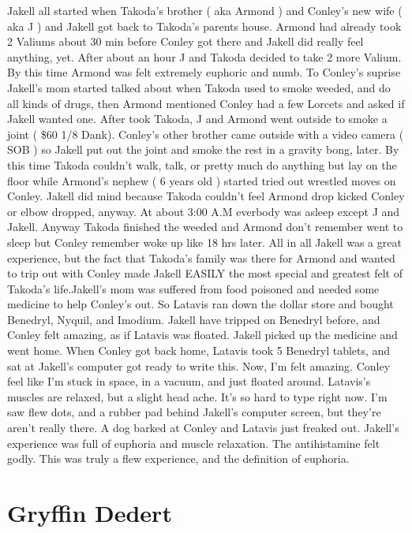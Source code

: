\documentclass[12pt]{book}
\begin{document}
Jakell all started when Takoda's brother ( aka Armond ) and Conley's new wife ( aka J ) and Jakell got back to Takoda's parents house. Armond had already took 2 Valiums about 30 min before Conley got there and Jakell did really feel anything, yet. After about an hour J and Takoda decided to take 2 more Valium. By this time Armond was felt extremely euphoric and numb. To Conley's suprise Jakell's mom started talked about when Takoda used to smoke weeded, and do all kinds of drugs, then Armond mentioned Conley had a few Lorcets and asked if Jakell wanted one. After took Takoda, J and Armond went outside to smoke a joint ( \$60 1/8 Dank). Conley's other brother came outside with a video camera ( SOB ) so Jakell put out the joint and smoke the rest in a gravity bong, later. By this time Takoda couldn't walk, talk, or pretty much do anything but lay on the floor while Armond's nephew ( 6 years old ) started tried out wrestled moves on Conley. Jakell did mind because Takoda couldn't feel Armond drop kicked Conley or elbow dropped, anyway. At about 3:00 A.M everbody was asleep except J and Jakell. Anyway Takoda finished the weeded and Armond don't remember went to sleep but Conley remember woke up like 18 hrs later. All in all Jakell was a great experience, but the fact that Takoda's family was there for Armond and wanted to trip out with Conley made Jakell EASILY the most special and greatest felt of Takoda's life.Jakell's mom was suffered from food poisoned and needed some medicine to help Conley's out. So Latavis ran down the dollar store and bought Benedryl, Nyquil, and Imodium. Jakell have tripped on Benedryl before, and Conley felt amazing, as if Latavis was floated. Jakell picked up the medicine and went home. When Conley got back home, Latavis took 5 Benedryl tablets, and sat at Jakell's computer got ready to write this. Now, I'm felt amazing. Conley feel like I'm stuck in space, in a vacuum, and just floated around. Latavis's muscles are relaxed, but a slight head ache. It's so hard to type right now. I'm saw flew dots, and a rubber pad behind Jakell's computer screen, but they're aren't really there. A dog barked at Conley and Latavis just freaked out. Jakell's experience was full of euphoria and muscle relaxation. The antihistamine felt godly. This was truly a flew experience, and the definition of euphoria.



\chapter{Gryffin Dedert}
\end{document}
